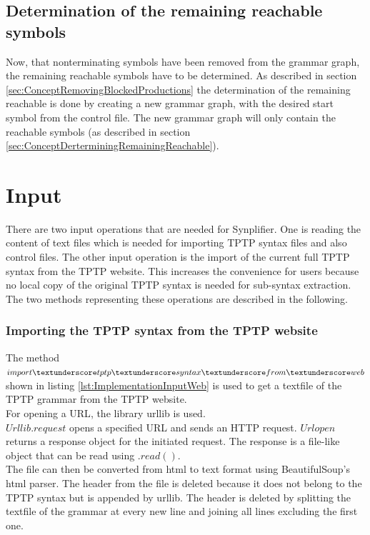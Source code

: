 \subsection{Determination of the remaining reachable symbols}

Now, that nonterminating symbols have been removed from the grammar graph, the remaining reachable symbols have to be determined.
As described in section \ref{sec:ConceptRemovingBlockedProductions} the determination of the remaining reachable is done by creating a new grammar graph, with the desired start symbol from the control file.
The new grammar graph will only contain the reachable symbols (as described in section \ref{sec:ConceptDerterminingRemainingReachable}). 

\section{Input}\label{sec:ImplementationInput}
There are two input operations that are needed for \ac{Synplifier}.
One is reading the content of text files which is needed for importing \ac{TPTP} syntax files and also control files.
The other input operation is the import of the current full \ac{TPTP} syntax from the \ac{TPTP} website.
This increases the convenience for users because no local copy of the original \ac{TPTP} syntax is needed for sub-syntax extraction.\\
The two methods representing these operations are described in the following.

\subsubsection{Importing the \ac{TPTP} syntax from the \ac{TPTP} website}

The method $import\textunderscore tptp\textunderscore syntax\textunderscore from\textunderscore web$ shown in listing \ref{lst:ImplementationInputWeb} is used to get a textfile of the \ac{TPTP} grammar from the \ac{TPTP} website. \\
For opening a \ac{URL}, the library urllib is used. \\ $Urllib.request$ opens a specified \ac{URL} and sends an HTTP request. $Urlopen$ returns a response object for the initiated request. The response is a file-like object that can be read using $.read()$. \cite{urllib} \\
The file can then be converted from html to text format using BeautifulSoup's html parser.
The header from the file is deleted because it does not belong to the \ac{TPTP} syntax but is appended by urllib. The header is deleted by splitting the textfile of the grammar at every new line and joining all lines excluding the first one. \\

